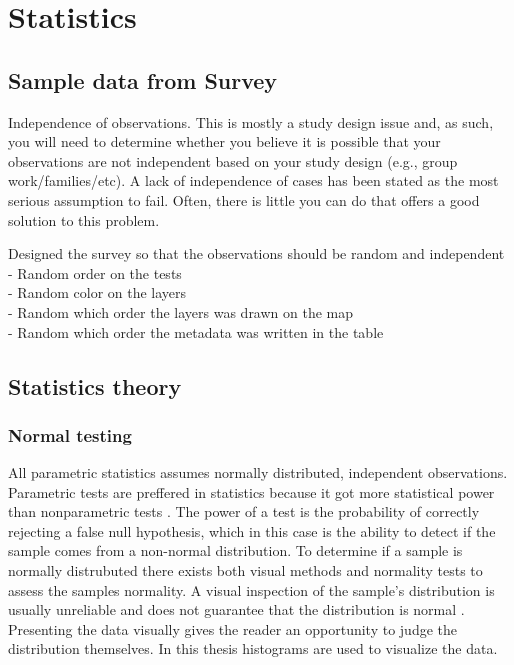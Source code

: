 \chapter{Statistics}


\section{Sample data from Survey}

Independence of observations. This is mostly a study design issue and, as such, you will need to determine whether you believe it is possible that your observations are not independent based on your study design (e.g., group work/families/etc). A lack of independence of cases has been stated as the most serious assumption to fail. Often, there is little you can do that offers a good solution to this problem. %


Designed the survey so that the observations should be random and independent \\
- Random order on the tests \\
- Random color on the layers \\
- Random which order the layers was drawn on the map \\
- Random which order the metadata was written in the table \\

\section{Statistics theory}


\subsection{Normal testing}\label{subsec:normaltesting}
All parametric statistics assumes normally distributed, independent observations. Parametric tests are preffered in statistics because it got more statistical power than nonparametric tests \citep{Frost2015}. The power of a test is the probability of correctly rejecting a false null hypothesis, which in this case is the ability to detect if the sample comes from a non-normal distribution. To determine if a sample is normally distrubuted there exists both visual methods and normality tests to assess the samples normality. A visual inspection of the sample's distribution is usually unreliable and does not guarantee that the distribution is normal \citep{Pearson2006}. Presenting the data visually gives the reader an opportunity to judge the distribution themselves. In this thesis histograms are used to visualize the data. 

